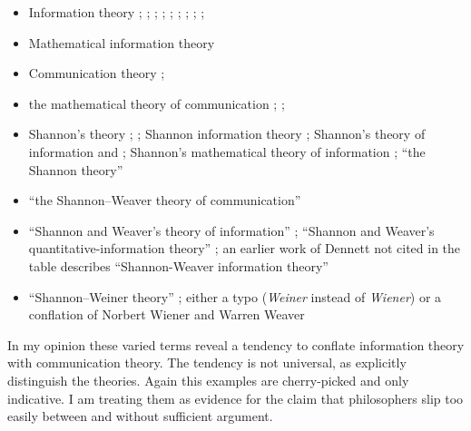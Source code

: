 \begin{itemize}
    \item Information theory \citep[p. 3 passim]{adriaans2019information}; \citep[12]{shea2018representation}; \citep[614]{timpson2006grammar}; \citep[2]{baker2021natural}; \citep[3]{kirchhoff2021universal}; \citep[$\S$6]{dennett2017bacteria}; \citep[1]{isaac2018semantics}; \citep[8]{godfrey-smith2016biological}; \citep[p. 330, n. 8 passim]{rathkopf2017neural} \citep[p. 777 as ``this formal information theory'']{owren2010redefining}; \citep[p. 1991 as ``the theory of information'']{lombardi2015shannon}
    \item Mathematical information theory \citep[1]{godfrey-smith2016biological}
    \item Communication theory \citep[592]{timpson2006grammar}; \citep[1987]{lombardi2015shannon}
    \item the mathematical theory of communication \citep[1]{floridi2019semantic}; \citep[322]{rathkopf2017neural}; \citep[1988]{lombardi2015shannon}
    \item Shannon's theory \citep[2]{isaac2018semantics}; \citep[1984]{lombardi2015shannon}; Shannon information theory \citep[400]{lean2014shannon}; Shannon's theory of information \citep[p. 78, n. 5]{shea2018representation} and \citep[6]{isaac2018semantics}; Shannon's mathematical theory of information \citep[$\S$1.1]{dennett2017bacteria}; ``the Shannon theory'' \citep[p. 599 n. 15]{timpson2006grammar}
    \item ``the Shannon–Weaver theory of communication'' \citep[p. 756 n. 3]{owren2010redefining}
    \item ``Shannon and Weaver's \parencite*{shannon1949mathematical} theory of information'' \citep[759]{owren2010redefining}; ``Shannon and Weaver's quantitative-information theory'' \citep[761]{owren2010redefining}; an earlier work of Dennett not cited in the table describes ``Shannon-Weaver information theory'' \citep[344]{dennett1983intentional}
    \item ``Shannon–Weiner theory'' \citep[19]{baker2021natural}; either a typo (\textit{Weiner} instead of \textit{Wiener}) or a conflation of Norbert Wiener and Warren Weaver
\end{itemize}

\noindent In my opinion these varied terms reveal a tendency to conflate information theory with communication theory.
The tendency is not universal, as \citet[17-20]{piccinini2011information} explicitly distinguish the theories.
Again this examples are cherry-picked and only indicative.
I am treating them as evidence for the claim that philosophers slip too easily between \ait{} and \act{} without sufficient argument.

